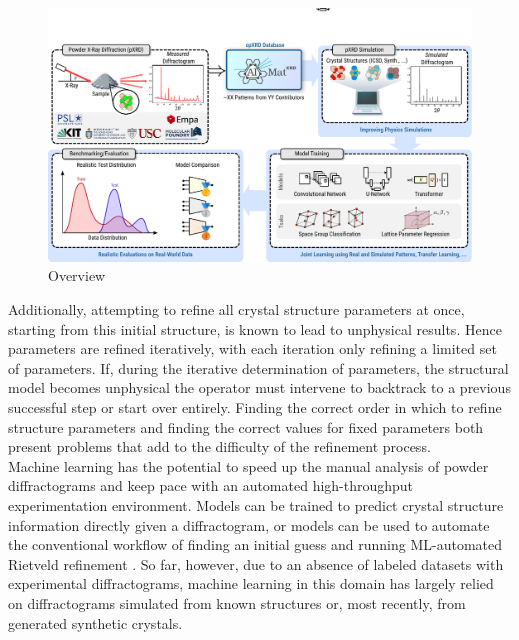 \begin{figure}[!b]
    \centering
    \includegraphics[width=1.0\linewidth]{figures/figure1_v5.pdf}
    \caption{Overview}
    \label{fig:overview}
\end{figure}

Additionally, attempting to refine all crystal structure parameters at once, starting from this initial structure, is known to lead to unphysical results\cite{Ozaki2020}. Hence parameters are refined iteratively, with each iteration only refining a limited set of parameters. If, during the iterative determination of parameters, the structural model becomes unphysical the operator must intervene to backtrack to a previous successful step or start over entirely. Finding the correct order in which to refine structure parameters and finding the correct values for fixed parameters both present problems that add to the difficulty of the refinement process.\\


Machine learning has the potential to speed up the manual analysis of powder diffractograms and keep pace with an automated high-throughput experimentation environment\cite{Agrawal2019, Surdu2023}.
Models can be trained to predict crystal structure information directly given a diffractogram, or models can be used to automate the conventional workflow of finding an initial guess \cite{Surdu2023} and running ML-automated Rietveld refinement \cite{Feng2019}.
So far, however, due to an absence of labeled datasets with experimental diffractograms\cite{Wang2020}, machine learning in this domain has largely relied on diffractograms simulated from known structures\cite{Park2017, Lee2023} or, most recently, from generated synthetic crystals\cite{Schopmans2023}. \\

